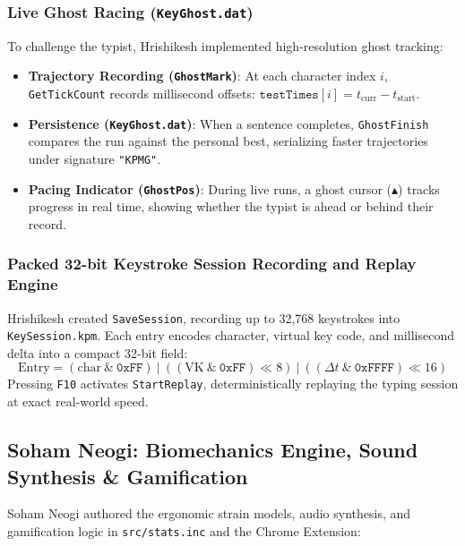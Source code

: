 \documentclass[11pt,a4paper]{article}
\begin{document}
\subsubsection{Live Ghost Racing (\texttt{KeyGhost.dat})}
To challenge the typist, Hrishikesh implemented high-resolution ghost tracking:
\begin{itemize}[leftmargin=*]
  \item \textbf{Trajectory Recording (\texttt{GhostMark})}: At each character index $i$, \texttt{GetTickCount} records millisecond offsets: $\texttt{testTimes}[i] = t_{\text{curr}} - t_{\text{start}}$.
  \item \textbf{Persistence (\texttt{KeyGhost.dat})}: When a sentence completes, \texttt{GhostFinish} compares the run against the personal best, serializing faster trajectories under signature \texttt{"KPMG"}.
  \item \textbf{Pacing Indicator (\texttt{GhostPos})}: During live runs, a ghost cursor ($\blacktriangle$) tracks progress in real time, showing whether the typist is ahead or behind their record.
\end{itemize}

\subsubsection{Packed 32-bit Keystroke Session Recording and Replay Engine}
Hrishikesh created \texttt{SaveSession}, recording up to 32,768 keystrokes into \texttt{KeySession.kpm}. Each entry encodes character, virtual key code, and millisecond delta into a compact 32-bit field:
\begin{equation}
  \text{Entry} = (\text{char} \ \& \ \texttt{0xFF}) \ \vert \ ((\text{VK} \ \& \ \texttt{0xFF}) \ll 8) \ \vert \ ((\Delta t \ \& \ \texttt{0xFFFF}) \ll 16)
\end{equation}
Pressing \texttt{F10} activates \texttt{StartReplay}, deterministically replaying the typing session at exact real-world speed.

\subsection{Soham Neogi: Biomechanics Engine, Sound Synthesis \& Gamification}
Soham Neogi authored the ergonomic strain models, audio synthesis, and gamification logic in \texttt{src/stats.inc} and the Chrome Extension:
\end{document}
